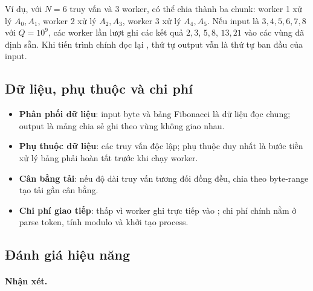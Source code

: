 Ví dụ, với $N=6$ truy vấn và 3 worker, có thể chia thành ba chunk: worker 1 xử lý $A_0,A_1$, worker 2 xử lý $A_2,A_3$, worker 3 xử lý $A_4,A_5$. Nếu input là $3,4,5,6,7,8$ với $Q=10^9$, các worker lần lượt ghi các kết quả $2,3$, $5,8$, $13,21$ vào các vùng đã định sẵn. Khi tiến trình chính đọc lại , thứ tự output vẫn là thứ tự ban đầu của input.

\subsection{Dữ liệu, phụ thuộc và chi phí}
\begin{itemize}
  \item \textbf{Phân phối dữ liệu}: input byte và bảng Fibonacci là dữ liệu đọc chung; output là mảng chia sẻ ghi theo vùng không giao nhau.
  \item \textbf{Phụ thuộc dữ liệu}: các truy vấn độc lập; phụ thuộc duy nhất là bước tiền xử lý bảng phải hoàn tất trước khi chạy worker.
  \item \textbf{Cân bằng tải}: nếu độ dài truy vấn tương đối đồng đều, chia theo byte-range tạo tải gần cân bằng.
  \item \textbf{Chi phí giao tiếp}: thấp vì worker ghi trực tiếp vào ; chi phí chính nằm ở parse token, tính modulo và khởi tạo process.
\end{itemize}

\subsection{Đánh giá hiệu năng}

\paragraph{Nhận xét.}
